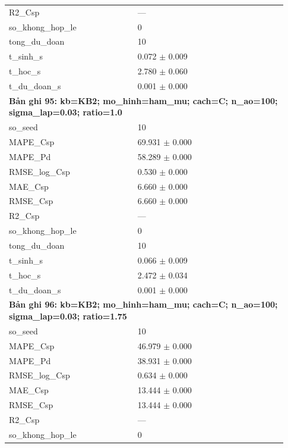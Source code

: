 \begin{longtable}{p{0.43\linewidth}p{0.50\linewidth}}
R2\_\allowbreak Csp & — \\
so\_\allowbreak khong\_\allowbreak hop\_\allowbreak le & 0 \\
tong\_\allowbreak du\_\allowbreak doan & 10 \\
t\_\allowbreak sinh\_\allowbreak s & 0.072 $\pm$ 0.009 \\
t\_\allowbreak hoc\_\allowbreak s & 2.780 $\pm$ 0.060 \\
t\_\allowbreak du\_\allowbreak doan\_\allowbreak s & 0.001 $\pm$ 0.000 \\
\midrule
\multicolumn{2}{p{0.95\linewidth}}{\textbf{Bản ghi 95: kb=KB2; mo\_hinh=ham\_mu; cach=C; n\_ao=100; sigma\_lap=0.03; ratio=1.0}} \\
so\_\allowbreak seed & 10 \\
MAPE\_\allowbreak Csp & 69.931 $\pm$ 0.000 \\
MAPE\_\allowbreak Pd & 58.289 $\pm$ 0.000 \\
RMSE\_\allowbreak log\_\allowbreak Csp & 0.530 $\pm$ 0.000 \\
MAE\_\allowbreak Csp & 6.660 $\pm$ 0.000 \\
RMSE\_\allowbreak Csp & 6.660 $\pm$ 0.000 \\
R2\_\allowbreak Csp & — \\
so\_\allowbreak khong\_\allowbreak hop\_\allowbreak le & 0 \\
tong\_\allowbreak du\_\allowbreak doan & 10 \\
t\_\allowbreak sinh\_\allowbreak s & 0.066 $\pm$ 0.009 \\
t\_\allowbreak hoc\_\allowbreak s & 2.472 $\pm$ 0.034 \\
t\_\allowbreak du\_\allowbreak doan\_\allowbreak s & 0.001 $\pm$ 0.000 \\
\midrule
\multicolumn{2}{p{0.95\linewidth}}{\textbf{Bản ghi 96: kb=KB2; mo\_hinh=ham\_mu; cach=C; n\_ao=100; sigma\_lap=0.03; ratio=1.75}} \\
so\_\allowbreak seed & 10 \\
MAPE\_\allowbreak Csp & 46.979 $\pm$ 0.000 \\
MAPE\_\allowbreak Pd & 38.931 $\pm$ 0.000 \\
RMSE\_\allowbreak log\_\allowbreak Csp & 0.634 $\pm$ 0.000 \\
MAE\_\allowbreak Csp & 13.444 $\pm$ 0.000 \\
RMSE\_\allowbreak Csp & 13.444 $\pm$ 0.000 \\
R2\_\allowbreak Csp & — \\
so\_\allowbreak khong\_\allowbreak hop\_\allowbreak le & 0 \\

\end{longtable}
